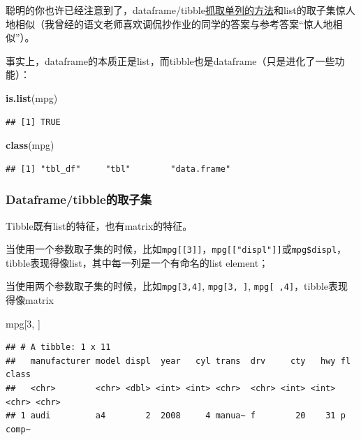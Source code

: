 \documentclass[]{book}
\newenvironment{Shaded}{\begin{snugshade}}{\end{snugshade}}
\newcommand{\DecValTok}[1]{\textcolor[rgb]{0.00,0.00,0.81}{#1}}
\newcommand{\KeywordTok}[1]{\textcolor[rgb]{0.13,0.29,0.53}{\textbf{#1}}}
\newcommand{\NormalTok}[1]{#1}
\begin{document}
聪明的你也许已经注意到了，dataframe/tibble\protect\hyperlink{single-column}{抓取单列的方法}和list的取子集惊人地相似（我曾经的语文老师喜欢调侃抄作业的同学的答案与参考答案``惊人地相似''）。

事实上，dataframe的本质正是list，而tibble也是dataframe（只是进化了一些功能）：

\begin{Shaded}
\begin{Highlighting}[]
\KeywordTok{is.list}\NormalTok{(mpg)}
\end{Highlighting}
\end{Shaded}

\begin{verbatim}
## [1] TRUE
\end{verbatim}

\begin{Shaded}
\begin{Highlighting}[]
\KeywordTok{class}\NormalTok{(mpg)}
\end{Highlighting}
\end{Shaded}

\begin{verbatim}
## [1] "tbl_df"     "tbl"        "data.frame"
\end{verbatim}

\hypertarget{dataframe-subsetting}{%
\subsubsection{Dataframe/tibble的取子集}\label{dataframe-subsetting}}

Tibble既有list的特征，也有matrix的特征。

当使用一个参数取子集的时候，比如\texttt{mpg{[}{[}3{]}{]}}，\texttt{mpg{[}{[}"displ"{]}{]}}或\texttt{mpg\$displ}，tibble表现得像list，其中每一列是一个有命名的list element；

当使用两个参数取子集的时候，比如\texttt{mpg{[}3,4{]}}, \texttt{mpg{[}3,\ {]}}, \texttt{mpg{[}\ ,4{]}}，tibble表现得像matrix

\begin{Shaded}
\begin{Highlighting}[]
\NormalTok{mpg[}\DecValTok{3}\NormalTok{, ]}
\end{Highlighting}
\end{Shaded}

\begin{verbatim}
## # A tibble: 1 x 11
##   manufacturer model displ  year   cyl trans  drv     cty   hwy fl    class
##   <chr>        <chr> <dbl> <int> <int> <chr>  <chr> <int> <int> <chr> <chr>
## 1 audi         a4        2  2008     4 manua~ f        20    31 p     comp~
\end{verbatim}
\end{document}
